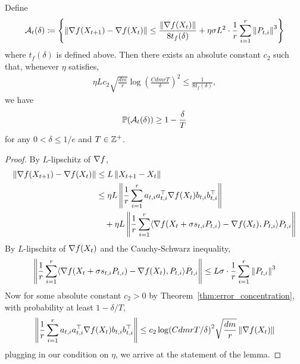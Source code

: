 \begin{lemma}\label{lem:gradient-change}
    Define
    \begin{align*}
        \mathcal A_t(\delta) \coloneqq \set{\mg{\grad f(X_{t+1}) - \grad f(X_t)} \leq \frac{\mg{\grad f(X_t)}}{8t_f(\delta)} + \eta \sigma L^2 \cdot \frac 1r \sum_{i=1}^r \mg{P_{t,i}}^3}
    \end{align*}
    where $t_f(\delta)$ is defined above. Then there exists an absolute constant $c_2$ such that, whenever $\eta$ satisfies,
    \begin{align}
        \label{eq:gradient-change-step-size}
        \eta L c_2 \sqrt{\frac{dm}{r}} \log(\frac{CdmrT}{\delta})^2 \leq \frac{1}{8t_f(\delta)},
    \end{align}
    we have
    \begin{align*}
        \P(\mathcal A_t(\delta)) \geq 1 - \frac{\delta}{T}
    \end{align*}
    for any $0 < \delta \leq 1/e$ and $T \in \bZ^+$. 
\end{lemma}
\begin{proof}
    By $L$-lipschitz of $\grad f$,
    \begin{align*}
        \mg{\grad f(X_{t+1}) - \grad f(X_t)} &\leq L\mg{X_{t+1} - X_t} \\
        &\leq \eta L \left \|\frac 1r \sum_{i=1}^r a_{t,i}a_{t,i}^\top \grad f(X_t) b_{t,i}b_{t,i}^\top \right \| \\
        &\quad + \eta L \left \|\frac 1r \sum_{i=1}^r \langle \grad f(X_t + \sigma s_{t,i} P_{t,i}) - \grad f(X_t), P_{t,i} \rangle P_{t,i}\right \|
    \end{align*}
    By $L$-lipschitz of $\grad f(X_t)$ and the Cauchy-Schwarz inequality,
    \begin{align*}
        \left \|\frac 1r \sum_{i=1}^r \langle \grad f(X_t + \sigma s_{t,i} P_{t,i}) - \grad f(X_t), P_{t,i} \rangle P_{t,i}\right \| \leq L \sigma \cdot \frac{1}{r} \sum_{i=1}^r \mg{P_{t,i}}^3
    \end{align*}
    Now for some absolute constant $c_2 > 0$ by Theorem~\ref{thm:error_concentration}, with probability at least $1-\delta/T$,
    \begin{align*}
        \left \|\frac 1r \sum_{i=1}^r a_{t,i}a_{t,i}^\top \grad f(X_t) b_{t,i}b_{t,i}^\top \right \| \leq c_2 \log(CdmrT/\delta)^2 \sqrt{\frac{dm}{r}} \mg{\grad f(X_t)}
    \end{align*} 
    plugging in our condition on $\eta$, we arrive at the statement of the lemma.
\end{proof}


